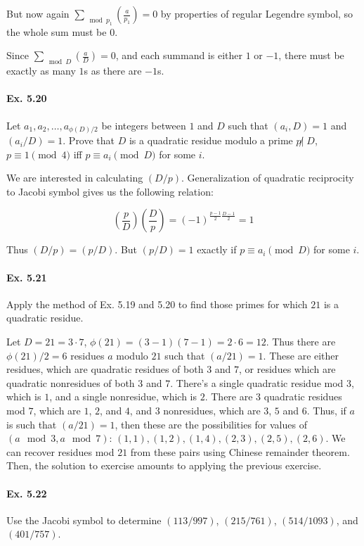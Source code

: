 \documentclass[notitlepage]{article}
\theoremstyle{definition}
\begin{document}
But now again $\sum_{\mod p_1} \left(\frac{a}{p_1}\right) = 0$ by
properties of regular Legendre symbol, so the whole sum must be $0$.

Since $\sum_{\mod D} \left(\frac{a}{D}\right) = 0$, and each summand
is either $1$ or $-1$, there must be exactly as many $1$s as there are
$-1$s.

\paragraph{Ex. 5.20}
Let $a_1, a_2, \ldots, a_{\phi(D)/2}$ be integers between $1$ and $D$
such that $(a_i, D) = 1$ and $(a_i/D) = 1$. Prove that $D$ is a
quadratic residue modulo a prime $p \not | \; D$, $p \equiv 1 \pmod 4$
iff $p \equiv a_i \pmod D$ for some $i$.

We are interested in calculating $(D/p)$. Generalization of quadratic
reciprocity to Jacobi symbol gives us the following relation:

\begin{equation}
  \left(\frac{p}{D}\right)\left(\frac{D}{p}\right) = (-1)^{\frac{p-1}{2}\frac{D-1}{2}} = 1
\end{equation}

Thus $(D/p) = (p/D)$. But $(p/D) = 1$ exactly if $p \equiv a_i \pmod D$ for some $i$.

\paragraph{Ex. 5.21}
Apply the method of Ex. 5.19 and 5.20 to find those primes for which
$21$ is a quadratic residue.

Let $D = 21 = 3 \cdot 7$, $\phi(21) = (3-1)(7-1) = 2 \cdot 6 =
12$. Thus there are $\phi(21)/2 = 6$ residues $a$ modulo $21$ such
that $(a/21) = 1$. These are either residues, which are quadratic
residues of both $3$ and $7$, or residues which are quadratic
nonresidues of both $3$ and $7$. There's a single quadratic residue
mod $3$, which is $1$, and a single nonresidue, which is $2$. There
are $3$ quadratic residues mod $7$, which are $1$, $2$, and $4$, and
$3$ nonresidues, which are $3$, $5$ and $6$. Thus, if $a$ is such that
$(a/21) = 1$, then these are the possibilities for values of $(a \mod
3, a \mod 7)$: $(1, 1), (1, 2), (1, 4), (2, 3), (2, 5), (2,6)$. We can
recover residues mod $21$ from these pairs using Chinese remainder
theorem. Then, the solution to exercise amounts to applying the previous exercise.

\paragraph{Ex. 5.22}
Use the Jacobi symbol to determine $(113/997)$, $(215/761)$,
$(514/1093)$, and $(401/757)$.
\end{document}
